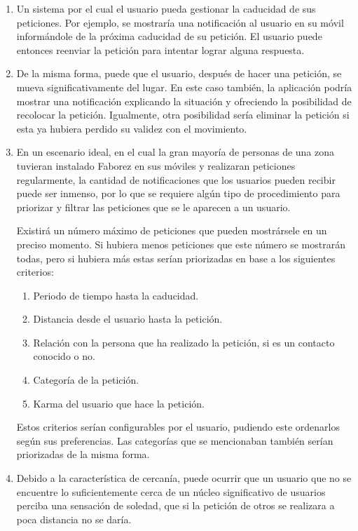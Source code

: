 \documentclass[main]{subfiles}
\begin{document}
\begin{enumerate}
  \item Un sistema por el cual el usuario pueda gestionar la caducidad de sus peticiones. Por ejemplo, se mostraría una notificación al usuario en su móvil informándole de la próxima caducidad de su petición. El usuario puede entonces reenviar la petición para intentar lograr alguna respuesta.
  
  \item De la misma forma, puede que el usuario, después de hacer una petición, se mueva significativamente del lugar. En este caso también, la aplicación podría mostrar una notificación explicando la situación y ofreciendo la posibilidad de recolocar la petición. Igualmente, otra posibilidad sería eliminar la petición si esta ya hubiera perdido su validez con el movimiento.
  
  \item En un escenario ideal, en el cual la gran mayoría de personas de una zona tuvieran instalado Faborez en sus móviles y realizaran peticiones regularmente, la cantidad de notificaciones que los usuarios pueden recibir puede ser inmenso, por lo que se requiere algún tipo de procedimiento para priorizar y filtrar las peticiones que se le aparecen a un usuario.
  
  Existirá un número máximo de peticiones que pueden mostrársele en un preciso momento. Si hubiera menos peticiones que este número se mostrarán todas, pero si hubiera más estas serían priorizadas en base a los siguientes criterios:
  \begin{enumerate}
    \item Periodo de tiempo hasta la caducidad.
    \item Distancia desde el usuario hasta la petición.
    \item Relación con la persona que ha realizado la petición, si es un contacto conocido o no.
    \item Categoría de la petición.
    \item Karma del usuario que hace la petición.
  \end{enumerate}
  
  Estos criterios serían configurables por el usuario, pudiendo este ordenarlos según sus preferencias. Las categorías que se mencionaban también serían priorizadas de la misma forma.
  
  \item Debido a la característica de cercanía, puede ocurrir que un usuario que no se encuentre lo suficientemente cerca de un núcleo significativo de usuarios perciba una sensación de soledad, que si la petición de otros se realizara a poca distancia no se daría.
  

\end{enumerate}
\end{document}
